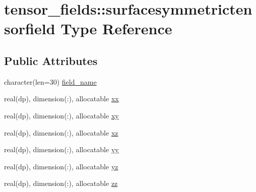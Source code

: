 \hypertarget{structtensor__fields_1_1surfacesymmetrictensorfield}{\section{tensor\-\_\-fields\-:\-:surfacesymmetrictensorfield Type Reference}
\label{structtensor__fields_1_1surfacesymmetrictensorfield}
}
\subsection*{Public Attributes}
\begin{DoxyCompactItemize}
\item 
character(len=30) \hyperlink{structtensor__fields_1_1surfacesymmetrictensorfield_a7daef040982298de36e277df0dbf259c}{field\-\_\-name}
\item 
real(dp), dimension(\-:), allocatable \hyperlink{structtensor__fields_1_1surfacesymmetrictensorfield_a8c7a65f9a32955f22ce7fde065b59f33}{xx}
\item 
real(dp), dimension(\-:), allocatable \hyperlink{structtensor__fields_1_1surfacesymmetrictensorfield_aae2145d23c4e1db7dd0fcaf3c757ca4e}{xy}
\item 
real(dp), dimension(\-:), allocatable \hyperlink{structtensor__fields_1_1surfacesymmetrictensorfield_adad9c754591e3e46c6e6529aeae618e4}{xz}
\item 
real(dp), dimension(\-:), allocatable \hyperlink{structtensor__fields_1_1surfacesymmetrictensorfield_a0aaf3f8a01f551064ea3406e045592e9}{yy}
\item 
real(dp), dimension(\-:), allocatable \hyperlink{structtensor__fields_1_1surfacesymmetrictensorfield_a0f7d63dcfbf20e2d3216121730e4e8ab}{yz}
\item 
real(dp), dimension(\-:), allocatable \hyperlink{structtensor__fields_1_1surfacesymmetrictensorfield_a9ae96b1722f526d905d18bd4449b3800}{zz}
\end{DoxyCompactItemize}


